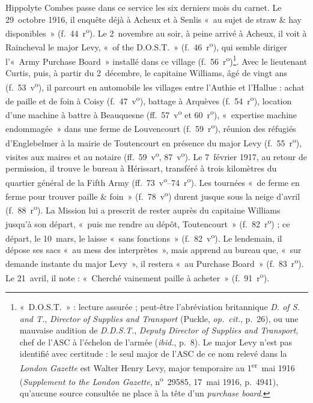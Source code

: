 Hippolyte Combes passe dans ce service les six derniers mois du carnet. Le 29~octobre 1916, il enquête déjà à Acheux et à Senlis «~au sujet de straw \& hay disponibles~» (f.~44~r\textsuperscript{o}). Le 2~novembre au soir, à peine arrivé à Acheux, il voit à Raincheval le major Levy, «~of the D.O.S.T.~» (f.~46~r\textsuperscript{o}), qui semble diriger l'«~Army Purchase Board~» installé dans ce village (f.~56~r\textsuperscript{o})\footnote{«~D.O.S.T.~» : lecture assurée ; peut-être l'abréviation britannique \textit{D. of S. and T.}, \textit{Director of Supplies and Transport} (Puckle, \textit{op.~cit.}, p.~26), ou une mauvaise audition de \textit{D.D.S.T.}, \textit{Deputy Director of Supplies and Transport}, chef de l'ASC à l'échelon de l'armée (\textit{ibid.}, p.~8). Le major Levy n'est pas identifié avec certitude : le seul major de l'ASC de ce nom relevé dans la \textit{London Gazette} est Walter Henry Levy, major temporaire au 1\textsuperscript{er}~mai 1916 (\textit{Supplement to the London Gazette}, n\textsuperscript{o}~29585, 17~mai 1916, p.~4941), qu'aucune source consultée ne place à la tête d'un \textit{purchase board}.}. Avec le lieutenant Curtis, puis, à partir du 2~décembre, le capitaine Williams, âgé de vingt ans (f.~53~v\textsuperscript{o}), il parcourt en automobile les villages entre l'Authie et l'Hallue : achat de paille et de foin à Coisy (f.~47~v\textsuperscript{o}), battage à Arquèves (f.~54~r\textsuperscript{o}), location d'une machine à battre à Beauquesne (ff.~57~v\textsuperscript{o} et 60~r\textsuperscript{o}), «~expertise machine endommagée~» dans une ferme de Louvencourt (f.~59~r\textsuperscript{o}), réunion des réfugiés d'Englebelmer à la mairie de Toutencourt en présence du major Levy (f.~55~r\textsuperscript{o}), visites aux maires et au notaire (ff.~59~v\textsuperscript{o}, 87~v\textsuperscript{o}). Le 7~février 1917, au retour de permission, il trouve le bureau à Hérissart, transféré à trois kilomètres du quartier général de la Fifth Army (ff.~73~v\textsuperscript{o}--74~r\textsuperscript{o}). Les tournées «~de ferme en ferme pour trouver paille \& foin~» (f.~78~v\textsuperscript{o}) durent jusque sous la neige d'avril (f.~88~r\textsuperscript{o}). La Mission lui a prescrit de rester auprès du capitaine Williams jusqu'à son départ, «~puis me rendre au dépôt, Toutencourt~» (f.~82~r\textsuperscript{o}) ; ce départ, le 10~mars, le laisse «~sans fonctions~» (f.~82~v\textsuperscript{o}). Le lendemain, il dépose ses sacs «~au mess des interprètes~», mais apprend au bureau que, «~sur demande instante du major Levy~», il restera «~au Purchase Board~» (f.~83~r\textsuperscript{o}). Le 21~avril, il note : «~Cherché vainement paille à acheter~» (f.~91~r\textsuperscript{o}).

